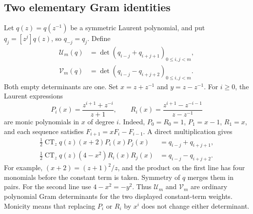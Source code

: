\documentclass[11pt]{article}
\theoremstyle{definition}
\theoremstyle{remark}
\newcommand{\CT}{\operatorname{CT}}
\newcommand{\UU}{\mathcal U}
\newcommand{\VV}{\mathcal V}
\theoremstyle{definition}
\theoremstyle{plain}
\numberwithin{equation}{section}
\begin{document}
\subsection{Two elementary Gram identities}
Let $q(z)=q(z^{-1})$ be a symmetric Laurent polynomial, and put
$q_j=[z^j]q(z)$, so $q_{-j}=q_j$. Define
\begin{align}
 \UU_m(q)&=\det(q_{i-j}+q_{i+j+1})_{0\le i,j<m},\label{rs:eq:U}\\
 \VV_m(q)&=\det(q_{i-j}-q_{i+j+2})_{0\le i,j<m}.
 \label{rs:eq:V}
\end{align}
Both empty determinants are one. Set $x=z+z^{-1}$ and $y=z-z^{-1}$.
For $i\ge0$, the Laurent expressions
\begin{equation}
 P_i(x)=\frac{z^{i+1}+z^{-i}}{z+1},\qquad
 R_i(x)=\frac{z^{i+1}-z^{-i-1}}{z-z^{-1}}
 \label{rs:eq:PR}
\end{equation}
are monic polynomials in $x$ of degree $i$. Indeed, $P_0=R_0=1$,
$P_1=x-1$, $R_1=x$, and each sequence satisfies
$F_{i+1}=xF_i-F_{i-1}$.
A direct multiplication gives
\begin{align}
 \tfrac12\CT_z q(z)(x+2)P_i(x)P_j(x)&=q_{i-j}+q_{i+j+1},\label{rs:eq:gramU}\\
 \tfrac12\CT_z q(z)(4-x^2)R_i(x)R_j(x)&=q_{i-j}-q_{i+j+2}.
 \label{rs:eq:gramV}
\end{align}
For example, $(x+2)=(z+1)^2/z$, and the product on the first line
has four monomials before the constant term is taken. Symmetry of $q$
merges them in pairs. For the second line use $4-x^2=-y^2$.
Thus $\UU_m$ and $\VV_m$ are ordinary polynomial Gram determinants for
the two displayed constant-term weights. Monicity means that replacing
$P_i$ or $R_i$ by $x^i$ does not change either determinant.
\end{document}

